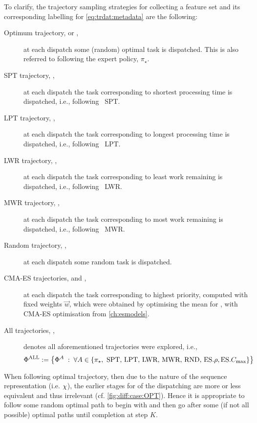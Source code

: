 \clearpage
To clarify, the trajectory sampling strategies for collecting a feature set and 
its corresponding labelling for \cref{eq:trdat:metadata} are the following:
\begin{description}
    \item[Optimum trajectory, \PhiSet{\OPT} or \PhiSet{\pi_\star},] at each 
    dispatch some (random) optimal task is dispatched. This is also referred to 
    following the expert policy, $\pi_\star$.
    \item[SPT trajectory, \PhiSet{\SPT},] at each dispatch the task 
    corresponding to shortest processing time is dispatched, i.e., following 
    \sdr~SPT.
    \item[LPT trajectory, \PhiSet{\LPT},] at each dispatch the task 
    corresponding to longest processing time is dispatched, i.e., following 
    \sdr~LPT.
    \item[LWR trajectory, \PhiSet{\LWR},] at each dispatch the task 
    corresponding to least work remaining is dispatched, i.e., following 
    \sdr~LWR.
    \item[MWR trajectory, \PhiSet{\MWR},] at each dispatch the task 
    corresponding to most work remaining is dispatched, i.e., following 
    \sdr~MWR.
    \item[Random trajectory, \PhiSet{\RND},] at each dispatch some random task 
    is dispatched.
    \item[CMA-ES trajectories, \PhiSet{\minRho} and \PhiSet{\minCmax},] at each 
    dispatch the task  corresponding to highest priority, computed with fixed 
    weights $\vec{w}$, which were obtained by optimising the mean for 
    \fullnamerho, with CMA-ES optimisation from \cref{ch:esmodels}. 
    \item[All trajectories, \PhiSet{\ALL},] denotes all aforementioned 
    trajectories were explored, i.e., \vspace*{-18pt}
    \begin{equation} \nonumber
    \Phi^{\text{ALL}}:=\left\{\Phi^{A}\;:\;\forall A \in 
    \left\{\pi_\star,\text{~SPT,~LPT,~LWR,~MWR,~RND,~}\text{ES}.{\rho},\text{ES}.{C_{\max}}\right\}\right\}
    \end{equation}
\end{description}

When following optimal trajectory, then due to the nature of the sequence 
representation (i.e. ${\mathbf{\chi}}$), the earlier stages for  of the 
dispatching are more or less equivalent and thus irrelevant (cf. 
\cref{fig:diff:case:OPT}). 
Hence it is appropriate to follow some random optimal path to begin with and 
then go after some (if not all possible) optimal paths until completion at step 
$K$. 

